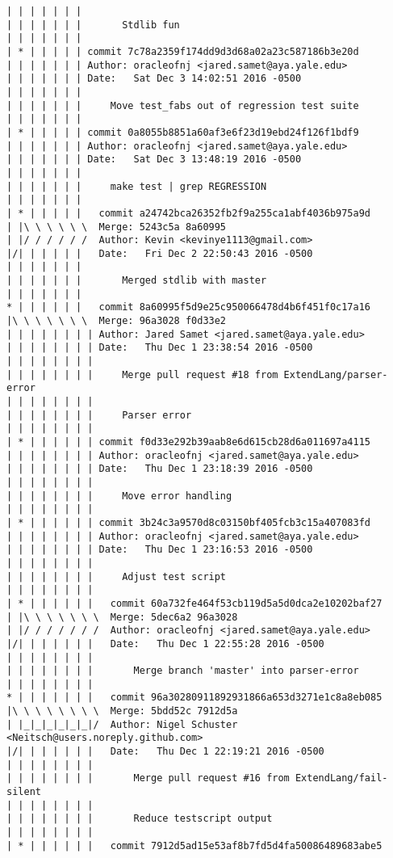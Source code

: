 \begin{lstlisting}
| | | | | | |       
| | | | | | |       Stdlib fun
| | | | | | |        
| * | | | | | commit 7c78a2359f174dd9d3d68a02a23c587186b3e20d
| | | | | | | Author: oracleofnj <jared.samet@aya.yale.edu>
| | | | | | | Date:   Sat Dec 3 14:02:51 2016 -0500
| | | | | | | 
| | | | | | |     Move test_fabs out of regression test suite
| | | | | | |        
| * | | | | | commit 0a8055b8851a60af3e6f23d19ebd24f126f1bdf9
| | | | | | | Author: oracleofnj <jared.samet@aya.yale.edu>
| | | | | | | Date:   Sat Dec 3 13:48:19 2016 -0500
| | | | | | | 
| | | | | | |     make test | grep REGRESSION
| | | | | | |          
| * | | | | |   commit a24742bca26352fb2f9a255ca1abf4036b975a9d
| |\ \ \ \ \ \  Merge: 5243c5a 8a60995
| |/ / / / / /  Author: Kevin <kevinye1113@gmail.com>
|/| | | | | |   Date:   Fri Dec 2 22:50:43 2016 -0500
| | | | | | |   
| | | | | | |       Merged stdlib with master
| | | | | | |          
* | | | | | |   commit 8a60995f5d9e25c950066478d4b6f451f0c17a16
|\ \ \ \ \ \ \  Merge: 96a3028 f0d33e2
| | | | | | | | Author: Jared Samet <jared.samet@aya.yale.edu>
| | | | | | | | Date:   Thu Dec 1 23:38:54 2016 -0500
| | | | | | | | 
| | | | | | | |     Merge pull request #18 from ExtendLang/parser-error
| | | | | | | |     
| | | | | | | |     Parser error
| | | | | | | |         
| * | | | | | | commit f0d33e292b39aab8e6d615cb28d6a011697a4115
| | | | | | | | Author: oracleofnj <jared.samet@aya.yale.edu>
| | | | | | | | Date:   Thu Dec 1 23:18:39 2016 -0500
| | | | | | | | 
| | | | | | | |     Move error handling
| | | | | | | |         
| * | | | | | | commit 3b24c3a9570d8c03150bf405fcb3c15a407083fd
| | | | | | | | Author: oracleofnj <jared.samet@aya.yale.edu>
| | | | | | | | Date:   Thu Dec 1 23:16:53 2016 -0500
| | | | | | | | 
| | | | | | | |     Adjust test script
| | | | | | | |           
| * | | | | | |   commit 60a732fe464f53cb119d5a5d0dca2e10202baf27
| |\ \ \ \ \ \ \  Merge: 5dec6a2 96a3028
| |/ / / / / / /  Author: oracleofnj <jared.samet@aya.yale.edu>
|/| | | | | | |   Date:   Thu Dec 1 22:55:28 2016 -0500
| | | | | | | |   
| | | | | | | |       Merge branch 'master' into parser-error
| | | | | | | |           
* | | | | | | |   commit 96a30280911892931866a653d3271e1c8a8eb085
|\ \ \ \ \ \ \ \  Merge: 5bdd52c 7912d5a
| |_|_|_|_|_|_|/  Author: Nigel Schuster <Neitsch@users.noreply.github.com>
|/| | | | | | |   Date:   Thu Dec 1 22:19:21 2016 -0500
| | | | | | | |   
| | | | | | | |       Merge pull request #16 from ExtendLang/fail-silent
| | | | | | | |       
| | | | | | | |       Reduce testscript output
| | | | | | | |           
| * | | | | | |   commit 7912d5ad15e53af8b7fd5d4fa50086489683abe5

\end{lstlisting}
